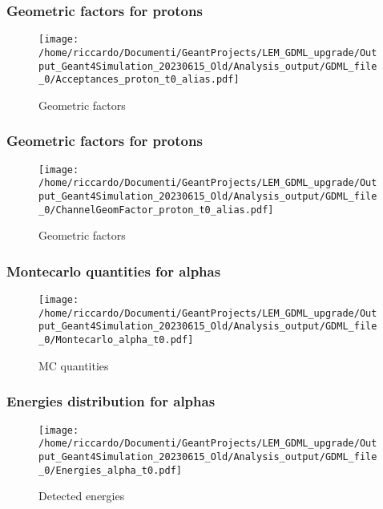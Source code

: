 \documentclass[8pt]{beamer}
\begin{document}
        \begin{frame}
            \frametitle{Geometric factors for protons}
        
        \begin{figure}[h]
            \centering
            \texttt{[image: /home/riccardo/Documenti/GeantProjects/LEM\_GDML\_upgrade/Output\_Geant4Simulation\_20230615\_Old/Analysis\_output/GDML\_file\_0/Acceptances\_proton\_t0\_alias.pdf]}
            \caption{Geometric factors}
        \end{figure}
        
        \end{frame}
        
        \begin{frame}
            \frametitle{Geometric factors for protons}
        
        \begin{figure}[h]
            \centering
            \texttt{[image: /home/riccardo/Documenti/GeantProjects/LEM\_GDML\_upgrade/Output\_Geant4Simulation\_20230615\_Old/Analysis\_output/GDML\_file\_0/ChannelGeomFactor\_proton\_t0\_alias.pdf]}
            \caption{Geometric factors}
        \end{figure}
        
        \end{frame}
        
        \begin{frame}
            \frametitle{Montecarlo quantities for alphas}
        
        \begin{figure}[h]
            \centering
            \texttt{[image: /home/riccardo/Documenti/GeantProjects/LEM\_GDML\_upgrade/Output\_Geant4Simulation\_20230615\_Old/Analysis\_output/GDML\_file\_0/Montecarlo\_alpha\_t0.pdf]}
            \caption{MC quantities}
        \end{figure}
        
        \end{frame}
        
        \begin{frame}
            \frametitle{Energies distribution for alphas}
        
        \begin{figure}[h]
            \centering
            \texttt{[image: /home/riccardo/Documenti/GeantProjects/LEM\_GDML\_upgrade/Output\_Geant4Simulation\_20230615\_Old/Analysis\_output/GDML\_file\_0/Energies\_alpha\_t0.pdf]}
            \caption{Detected energies}
        \end{figure}
        
        \end{frame}
        
\end{document}
